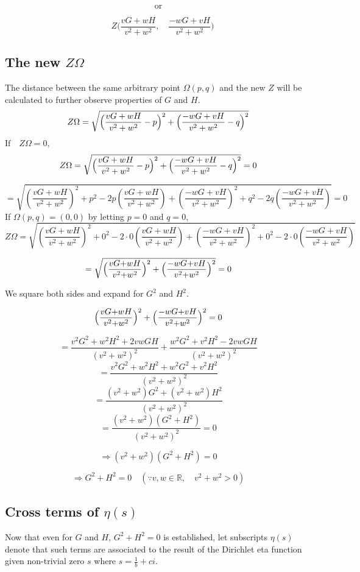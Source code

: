 \documentclass{amsart}
\begin{document}
	\[ \text{or} \]
	
	\[ \quad Z\biggr(\frac{vG+wH}{v^2+w^2}, \quad \frac{-wG+vH}{v^2+w^2}\biggl) \]
	
	\subsection{The new $Z\Omega$}
	The distance between the same arbitrary point $\Omega(p, q)$ and the new $Z$ will be calculated to further observe properties of $G$ and $H$.
	\[ Z\Omega = \sqrt{\Bigl( \frac{vG+wH}{v^2+w^2}-p \Bigr)^2 + \Bigl( \frac{-wG+vH}{v^2+w^2}-q \Bigr)^2} \]
	\[\]
	$ \text{If} \quad Z\Omega = 0, $
	\[ Z\Omega = \sqrt{\Bigl( \frac{vG+wH}{v^2+w^2}-p \Bigr)^2 + \Bigl( \frac{-wG+vH}{v^2+w^2}-q \Bigr)^2} = 0 \]
	
	\[ = \sqrt{  (\frac{vG{+}wH}{v^2{+}w^2})^2 {+} p^2 {-} 2p(\frac{vG{+}wH}{v^2{+}w^2}) {+} (\frac{-wG{+}vH}{v^2{+}w^2})^2 {+} q^2 {-}2q(\frac{-wG{+}vH}{v^2{+}w^2}) } = 0 \]
	\[\]
	\[\]
	If $\Omega(p, q) = (0, 0)$ by letting $p=0$ and $q=0$,
	\[ Z\Omega = \sqrt{  (\frac{vG{+}wH}{v^2{+}w^2})^2 {+} 0^2 {-} 2 {\cdot} 0 (\frac{vG{+}wH}{v^2{+}w^2}) {+} (\frac{-wG{+}vH}{v^2{+}w^2})^2 {+} 0^2 {-} 2 {\cdot} 0 (\frac{-wG{+}vH}{v^2{+}w^2}) } \]
	
	\[ = \sqrt{\Bigl(\frac{vG{+}wH}{v^2{+}w^2}\Bigr)^2 + \Bigl( \frac{-wG{+}vH}{v^2{+}w^2} \Bigr)^2} = 0 \]
	
	We square both sides and expand for $G^2$ and $H^2$.
	
	\[ \Bigl(\frac{vG{+}wH}{v^2{+}w^2}\Bigr)^2 + \Bigl(\frac{-wG{+}vH}{v^2{+}w^2}\Bigr)^2 = 0 \]
	
	\[ = \frac{v^2G^2 + w^2H^2 + 2vwGH}{(v^2+w^2)^2} + \frac{w^2G^2 + v^2H^2 - 2vwGH}{(v^2+w^2)^2} \]
	\[ = \frac{v^2G^2 + w^2H^2 + w^2G^2 + v^2H^2}{(v^2+w^2)^2} \]
	\[ = \frac{(v^2+w^2)G^2 + (v^2+w^2)H^2}{(v^2+w^2)^2} \]
	\[ = \frac{(v^2+w^2)(G^2 + H^2)}{(v^2+w^2)^2} = 0 \]
	
	\[ \Rightarrow (v^2+w^2)(G^2 + H^2) = 0 \]
	
	\[ \Rightarrow G^2 + H^2 = 0 \quad (\because v, w \in \mathbb{R}, \quad v^2 + w^2 > 0)  \]
	
	
	\subsection{Cross terms of $\eta(s)$}
	Now that even for $G$ and $H$, $G^2 + H^2 = 0$ is established, let subscripts $\eta(s)$ denote that such terms are associated to the result of the Dirichlet eta function given non-trivial zero $s$ where $s=\frac{1}{b}+ci$.
	
\end{document}
